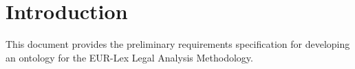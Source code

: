 \section{Introduction}\label{ariaid-title1}

This document provides the preliminary requirements specification for
developing an ontology for the EUR-Lex Legal Analysis Methodology.
